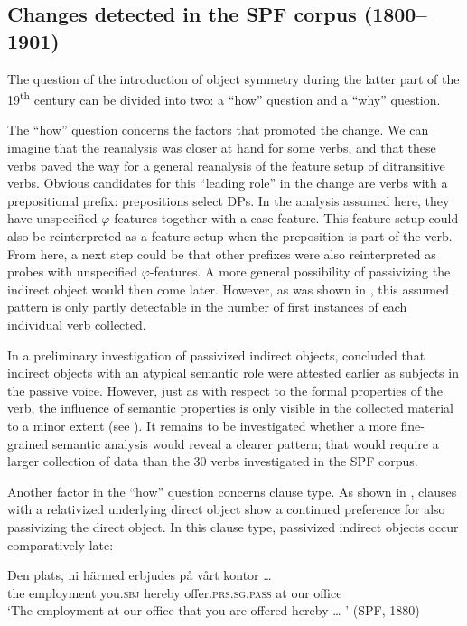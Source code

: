 \documentclass[output=paper]{langscibook}
\begin{document}
\subsection{Changes detected in the SPF corpus (1800–1901)}\label{sec:falk:5.2}


The question of the introduction of object symmetry during the latter part of the 19\textsuperscript{th} century can be divided into two: a “how” question and a “why” question.


The “how” question concerns the factors that promoted the change. We can imagine that the reanalysis was closer at hand for some verbs, and that these verbs paved the way for a general reanalysis of the feature setup of ditransitive verbs. Obvious candidates for this “leading role” in the change are verbs with a prepositional prefix: prepositions select DPs. In the analysis assumed here, they have unspecified $\varphi ${}-features together with a case feature. This feature setup could also be reinterpreted as a feature setup when the preposition is part of the verb. From here, a next step could be that other prefixes were also reinterpreted as probes with unspecified $\varphi ${}-features. A more general possibility of passivizing the indirect object would then come later. However, as was shown in , this assumed pattern is only partly detectable in the number of first instances of each individual verb collected.



In a preliminary investigation of passivized indirect objects, \citet{Falk1995,Falk1997} concluded that indirect objects with an atypical semantic role were attested earlier as subjects in the passive voice. However, just as with respect to the formal properties of the verb, the influence of semantic properties is only visible in the collected material to a minor extent (see ). It remains to be investigated whether a more fine-grained semantic analysis would reveal a clearer pattern; that would require a larger collection of data than the 30 verbs investigated in the SPF corpus.



Another factor in the “how” question concerns clause type. As shown in , clauses with a relativized underlying direct object show a continued preference for also passivizing the direct object. In this clause type, passivized indirect objects occur comparatively late:


\ea%
    \label{ex:falk:24}
\gll Den    plats,        ni        härmed  erbjudes          på  vårt  kontor … \\
    the    employment  you.\textsc{sbj}  hereby    offer\textsc{.prs.sg.pass}    at  our  office\\
\glt ‘The employment at our office that you are offered hereby … ’ (SPF, 1880)
\z
\end{document}
